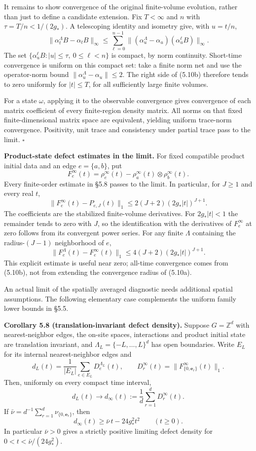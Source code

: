 \documentclass[
  11pt,
]{article}
\begin{document}
It remains to show convergence of the original finite-volume evolution,
rather than just to define a candidate extension. Fix \(T<\infty\) and
\(n\) with \(\tau=T/n<1/(2g_*)\). A telescoping identity and isometry give,
with \(u=t/n\),
\[
 \lVert \alpha_t^\Lambda B-\alpha_t B\rVert_\infty
 \leq\sum_{\ell=0}^{n-1}
 \lVert (\alpha_u^\Lambda-\alpha_u)(\alpha_u^\ell B)\rVert_\infty.          \tag{5.10b}
\]
The set
\(\{\alpha_u^\ell B:|u|\leq\tau,\ 0\leq\ell<n\}\) is compact,
by norm continuity. Short-time convergence is uniform on this compact
set: take a finite norm net and use the operator-norm bound
\(\lVert \alpha_u^\Lambda-\alpha_u\rVert\leq2\).
The right side of (5.10b) therefore tends to zero uniformly for
\(|t|\leq T\), for all sufficiently large finite volumes.

For a state \(\omega\), applying it to the observable convergence
gives convergence of each matrix coefficient of every finite-region
density matrix. All norms on that fixed finite-dimensional matrix
space are equivalent, yielding uniform trace-norm convergence.
Positivity, unit trace and consistency under partial trace pass to
the limit. \(\square\)

\textbf{Product-state defect estimates in the limit.} For fixed compatible
product initial data and an edge \(e=\{a,b\}\), put
\[
 F_e^\infty(t)=\rho_e^\infty(t)
             -\rho_a^\infty(t)\otimes\rho_b^\infty(t).
\]
Every finite-order estimate in §5.8 passes to the limit. In particular,
for \(J\geq1\) and every real \(t\),
\[
 \lVert F_e^\infty(t)-P_{e,J}(t)\rVert_1
 \leq2(J+2)(2g_*|t|)^{J+1}.                                    \tag{5.10c}
\]
The coefficients are the stabilized finite-volume derivatives.
For \(2g_*|t|<1\) the remainder tends to zero with \(J\), so the
identification with the derivatives of \(F_e^\infty\) at zero follows
from its convergent power series. For any finite \(\Lambda\)
containing the radius-\((J-1)\) neighborhood of \(e\),
\[
 \lVert F_e^\Lambda(t)-F_e^\infty(t)\rVert_1
 \leq4(J+2)(2g_*|t|)^{J+1}.                                    \tag{5.10d}
\]
This explicit estimate is useful near zero; all-time convergence comes
from (5.10b), not from extending the convergence radius of (5.10a).

An actual limit of the spatially averaged diagnostic needs additional
spatial assumptions. The following elementary case complements the
uniform family lower bounds in §5.5.

\textbf{Corollary 5.8 (translation-invariant defect density).} Suppose
\(G=\mathbb Z^d\) with nearest-neighbor edges, the on-site spaces,
interactions and product initial state are translation invariant, and
\(\Lambda_L=\{-L,\ldots,L\}^d\) has open boundaries. Write \(E_L\)
for its internal nearest-neighbor edges and
\[
 d_L(t)=\frac1{|E_L|}\sum_{e\in E_L}D_e^{\Lambda_L}(t),\qquad
 D_r^\infty(t)=\lVert F_{\{0,\mathbf e_r\}}^\infty(t)\rVert_1 .
\]
Then, uniformly on every compact time interval,
\[
 d_L(t)\longrightarrow d_\infty(t):=
 \frac1d\sum_{r=1}^dD_r^\infty(t).
\]
If \(\bar\nu=d^{-1}\sum_{r=1}^d\nu_{\{0,\mathbf e_r\}}\), then
\[
 d_\infty(t)\geq\bar\nu\,t-24g_*^2t^2\qquad(t\geq0).
\]
In particular \(\bar\nu>0\) gives a strictly positive limiting
defect density for \(0<t<\bar\nu/(24g_*^2)\).
\end{document}
